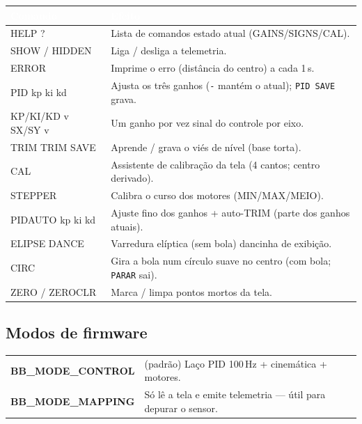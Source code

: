 \documentclass[11pt,a4paper,oneside]{article}
\newcommand{\rowstyle}{\rowcolor{rowgray}}
\begin{document}
\begin{center}
\small
\renewcommand{\arraystretch}{1.2}
\begin{tabularx}{\textwidth}{>{\ttfamily\footnotesize}l >{\RaggedRight\arraybackslash}X}
\toprule
\rowcolor{secondary}
\textcolor{white}{\normalfont\bfseries Comando} & \textcolor{white}{\normalfont\bfseries Efeito} \\
\midrule
HELP \quad ? & Lista de comandos \quad estado atual (GAINS/SIGNS/CAL). \\
\rowstyle SHOW / HIDDEN & Liga / desliga a telemetria. \\
ERROR & Imprime o erro (distância do centro) a cada 1\,s. \\
\rowstyle PID kp ki kd & Ajusta os três ganhos (\texttt{-} mantém o atual); \texttt{PID SAVE} grava. \\
KP/KI/KD v \quad SX/SY v & Um ganho por vez \quad sinal do controle por eixo. \\
\rowstyle TRIM \quad TRIM SAVE & Aprende / grava o viés de nível (base torta). \\
CAL & Assistente de calibração da tela (4 cantos; centro derivado). \\
\rowstyle STEPPER & Calibra o curso dos motores (MIN/MAX/MEIO). \\
PIDAUTO kp ki kd & Ajuste fino dos ganhos + auto-TRIM (parte dos ganhos atuais). \\
\rowstyle ELIPSE \quad DANCE & Varredura elíptica (sem bola) \quad dancinha de exibição. \\
CIRC & Gira a bola num círculo suave no centro (com bola; \texttt{PARAR} sai). \\
\rowstyle ZERO / ZEROCLR & Marca / limpa pontos mortos da tela. \\
\bottomrule
\end{tabularx}
\end{center}

\subsection{Modos de firmware}

\begin{center}
\small
\begin{tabularx}{\textwidth}{>{\ttfamily\bfseries}l >{\RaggedRight\arraybackslash}X}
\toprule
BB\_MODE\_CONTROL & (padrão) Laço PID 100\,Hz + cinemática + motores. \\
\rowstyle BB\_MODE\_MAPPING & Só lê a tela e emite telemetria — útil para depurar o sensor. \\
\bottomrule
\end{tabularx}
\end{center}
\end{document}
